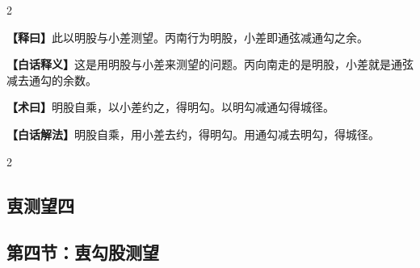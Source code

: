 \documentclass[11pt,a4paper]{article}
\newcommand{\WenExplain}{\textcolor{classicalcolor}{\textbf{【释曰】}}}
\newcommand{\BaiExplain}{\textcolor{moderncolor}{\textbf{【白话释义】}}}
\newcommand{\WenMethod}{\textcolor{classicalcolor}{\textbf{【术曰】}}}
\newcommand{\BaiMethod}{\textcolor{moderncolor}{\textbf{【白话解法】}}}
\begin{document}
\begin{paracol}{2}
\switchcolumn*
\begin{tcolorbox}[colback=red!5,colframe=red!30!black,boxrule=0.3pt]
\WenExplain\quad 此以明股与小差测望。丙南行为明股，小差即通弦减通勾之余。
\end{tcolorbox}
\switchcolumn
\begin{tcolorbox}[colback=blue!5,colframe=blue!30!black,boxrule=0.3pt]
\BaiExplain\quad 这是用明股与小差来测望的问题。丙向南走的是明股，小差就是通弦减去通勾的余数。
\end{tcolorbox}

\switchcolumn*
\begin{tcolorbox}[colback=red!5,colframe=red!40!black,boxrule=0.3pt]
\WenMethod\quad 明股自乘，以小差约之，得明勾。以明勾减通勾得城径。
\end{tcolorbox}
\switchcolumn
\begin{tcolorbox}[colback=blue!5,colframe=blue!40!black,boxrule=0.3pt]
\BaiMethod\quad 明股自乘，用小差去约，得明勾。用通勾减去明勾，得城径。
\end{tcolorbox}

\end{paracol}



\vspace{0.5em}

\begin{paracol}{2}
\subsection*{\textcolor{sectioncolor}{叀测望四}}
\switchcolumn
\subsection*{\textcolor{sectioncolor}{第四节：叀勾股测望}}
\end{paracol}

\vspace{0.5em}
\end{document}
